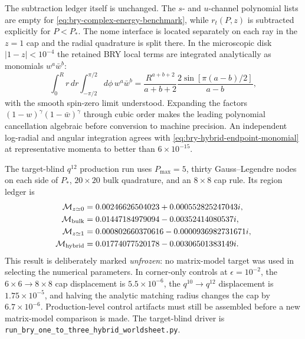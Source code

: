 \documentclass[11pt]{article}
\begin{document}
The subtraction ledger itself is unchanged.  The $s$- and $u$-channel
polynomial lists are empty for \eqref{eq:bry-complex-energy-benchmark}, while
$r_t(P,z)$ is subtracted explicitly for $P<P_*$.  The nome interface is
located separately on each ray in the $z=1$ cap and the radial quadrature is
split there.  In the microscopic disk $|1-z|<10^{-4}$ the retained BRY local
terms are integrated analytically as monomials $w^a\bar w^b$:
\begin{equation}
 \int_0^R r\,dr\int_{-\pi/2}^{\pi/2}d\phi\,
 w^a\bar w^b
 =\frac{R^{a+b+2}}{a+b+2}
   \frac{2\sin\!\left[\pi(a-b)/2\right]}{a-b},
 \label{eq:bry-hybrid-endpoint-monomial}
\end{equation}
with the smooth spin-zero limit understood.  Expanding the factors
$(1-w)^\gamma(1-\bar w)^\gamma$ through cubic order makes the leading
polynomial cancellation algebraic before conversion to machine precision.
An independent log-radial and angular integration agrees with
\eqref{eq:bry-hybrid-endpoint-monomial} at representative momenta to better
than $6\times10^{-15}$.

The target-blind $q^{12}$ production run uses $P_{\max}=5$, thirty
Gauss--Legendre nodes on each side of $P_*$, $20\times20$ bulk quadrature,
and an $8\times8$ cap rule.  Its region ledger is
\begin{align}
 \mathcal M_{z\simeq0}
  &=0.00246626504023+0.000552825247043i,
 \notag\\
 \mathcal M_{\rm bulk}
  &=0.01447184979094-0.00352414080537i,
 \notag\\
 \mathcal M_{z\simeq1}
  &=0.000802660370616-0.0000936982731671i,
 \notag\\
 \mathcal M_{\rm hybrid}
  &=0.01774077520178-0.00306501383149i.
 \label{eq:bry-hybrid-unfrozen-worldsheet-result}
\end{align}
This result is deliberately marked \emph{unfrozen}: no matrix-model target
was used in selecting the numerical parameters.  In corner-only controls at
$\epsilon=10^{-2}$, the $6\times6\to8\times8$ cap displacement is
$5.5\times10^{-6}$, the $q^{10}\to q^{12}$ displacement is
$1.75\times10^{-5}$, and halving the analytic matching radius changes the
cap by $6.7\times10^{-6}$.  Production-level control artifacts must still be
assembled before a new matrix-model comparison is made.  The target-blind
driver is \texttt{run\_bry\_one\_to\_three\_hybrid\_worldsheet.py}.
\end{document}
